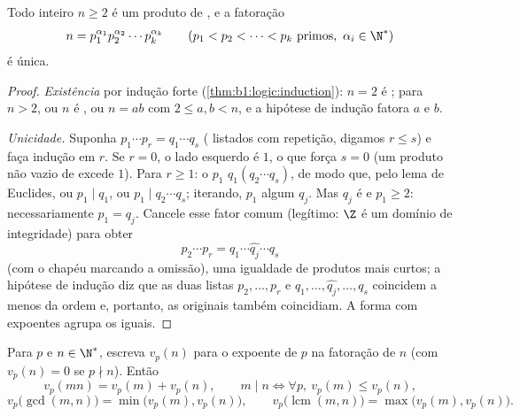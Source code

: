 \begin{theorem}\label{thm:b1:arith:fta}
Todo inteiro $n \geq 2$ é um produto de , e a fatoração
\[
n = p_1^{\alpha_1} p_2^{\alpha_2} \cdots p_k^{\alpha_k}
\qquad (p_1 < p_2 < \dots < p_k \text{ primos},\ \alpha_i \in \N^*)
\]
é única.
\end{theorem}

\begin{proof}
\emph{Existência} por indução forte (\cref{thm:b1:logic:induction}):
$n = 2$ é ; para $n > 2$, ou $n$ é , ou $n = ab$ com
$2 \leq a, b < n$, e a hipótese de indução fatora $a$ e $b$.

\emph{Unicidade.} Suponha $p_1 \cdots p_r = q_1 \cdots q_s$
( listados com repetição, digamos $r \leq s$) e faça indução em
$r$. Se $r = 0$, o lado esquerdo é $1$, o que força $s = 0$ (um produto
não vazio de  excede $1$). Para $r \geq 1$: o  $p_1$
 $q_1(q_2\cdots q_s)$, de modo que, pelo lema de Euclides, ou $p_1
\mid q_1$, ou $p_1 \mid q_2\cdots q_s$; iterando, $p_1$ 
algum $q_j$. Mas $q_j$ é  e $p_1 \geq 2$: necessariamente $p_1
= q_j$. Cancele esse fator comum (legítimo: $\Z$ é um
domínio de integridade) para obter
\[
p_2 \cdots p_r = q_1 \cdots \widehat{q_j} \cdots q_s
\]
(com o chapéu marcando a omissão), uma igualdade de produtos mais
curtos; a hipótese de indução diz que as duas listas $p_2, \dots, p_r$ e
$q_1, \dots, \widehat{q_j}, \dots, q_s$ coincidem a menos da ordem
e, portanto, as originais também coincidiam. A forma com expoentes
agrupa os  iguais.
\end{proof}

\begin{proposition}[Valorações]\label{prop:b1:arith:valuation}
Para $p$  e $n \in \N^*$, escreva $v_p(n)$ para o expoente de $p$ na
fatoração de $n$ (com $v_p(n) = 0$ se $p \nmid n$). Então
\[
v_p(mn) = v_p(m) + v_p(n),
\qquad
m \mid n \iff \forall p,\ v_p(m) \leq v_p(n),
\]
\[
v_p\bigl(\gcd(m,n)\bigr) = \min\bigl(v_p(m), v_p(n)\bigr),
\qquad
v_p\bigl(\operatorname{lcm}(m,n)\bigr) = \max\bigl(v_p(m),
v_p(n)\bigr).
\]
\end{proposition}

